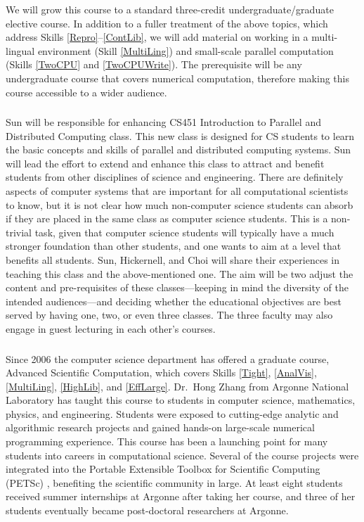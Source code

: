 \documentclass[11pt]{NSFamsart}
\begin{document}
We will grow this course to a standard three-credit undergraduate/graduate elective course.  In addition to a fuller treatment of the above topics, which address Skills \ref{Repro}--\ref{ContLib}, we will add material on working in a multi-lingual environment (Skill \ref{MultiLing}) and small-scale parallel computation (Skills \ref{TwoCPU} and \ref{TwoCPUWrite}).  The prerequisite will be any undergraduate course that covers numerical computation, therefore making this course accessible to a wider audience.

\subsubsection{\UGradParallelName} \label{UGradParallel} Sun will be responsible for enhancing CS451 Introduction to Parallel and Distributed Computing class. This new class is designed for CS students to learn the basic concepts and skills of parallel and distributed computing systems. Sun will lead the effort to extend and enhance this class to attract and benefit students from other disciplines of science and engineering. There are definitely aspects of computer systems that are important for all computational scientists to know, but it is not clear how much non-computer science students can absorb if they are placed in the same class as computer science students.  This is a non-trivial task, given that computer science students will typically have a much stronger foundation than other students, and one wants to aim at a level that benefits all students.  Sun, Hickernell, and Choi will share their experiences in teaching this class and the above-mentioned one.  The aim will be two adjust the content and pre-requisites of these classes---keeping in mind the diversity of the intended audiences---and deciding whether the educational objectives are best served by having one, two, or even three classes.  The three faculty may also engage in guest lecturing in each other's courses.

\subsubsection{\LargeSCName} \label{LargeSC} Since 2006 the computer science department has offered a graduate course, Advanced Scientific Computation, which covers Skills \ref{Tight}, \ref{AnalVis}, \ref{MultiLing}, \ref{HighLib}, and \ref{EffLarge}.  Dr.~Hong Zhang from Argonne National Laboratory has taught this course to students in computer science, mathematics, physics, and engineering. Students were exposed to cutting-edge analytic and algorithmic research projects and gained hands-on large-scale numerical programming experience. This course has been a launching point for many students into careers in computational science.  Several of the course projects were integrated into the Portable Extensible Toolbox for Scientific Computing (PETSc) \cite{petsc-web-page17}, benefiting the scientific community in large. At least eight students received summer internships at Argonne after taking her course, and three of her students eventually became post-doctoral researchers at Argonne.  
\end{document}
